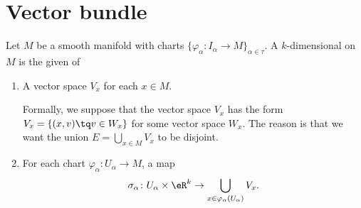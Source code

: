 
\section{Vector bundle}

\begin{definition}		\label{DEFooFRPLooTxMUzg}
	Let \( M\) be a smooth manifold with charts \( \{ \varphi_{\alpha} \colon I_{\alpha}\to M   \}_{\alpha\in \tau}\). A \( k\)-dimensional  on \( M\) is the given of
	\begin{enumerate}
		\item		\label{ITEMooIVKKooNEfxVi}
		      A vector space \( V_x\) for each \( x\in M\).

		      Formally, we suppose that the vector space \( V_x\) has the form \( V_x=\{ (x,v)\tq v\in W_x \}\) for some vector space \( W_x\). The reason is that we want the union \( E=\bigcup_{x\in M}V_x\) to be disjoint.
		\item
		      For each chart \(\varphi_{\alpha} \colon U_{\alpha}\to M  \), a map
		      \begin{equation}
			      \sigma_{\alpha} \colon U_{\alpha}\times \eR^k\to \bigcup_{x\in \varphi_{\alpha}(U_{\alpha})}V_x.
		      \end{equation}
	\end{enumerate}


\end{definition}
